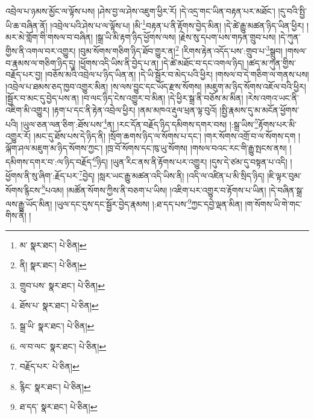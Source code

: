 འབྲེལ་པ་ཉམས་མྱོང་ལ་ལྟོས་པས། །ཤེས་བྱ་ལ་ཤེས་འཇུག་ཕྱིར་རོ། །དེ་འདྲ་གང་ཡིན་བརྟན་པར་མཐོང་། །དུ་བའི་སྤྱི་ཡི་ཆ་བཞིན་ནོ། །འབྲེལ་པའི་ཤེས་པ་ལ་ལྟོས་པ། །མི་\footnote{མ་  སྣར་ཐང་།  པེ་ཅིན། }བརྟན་པ་ནི་རྟོགས་བྱེད་མིན། །དེ་ཚེ་རྒྱུ་མཚན་ཉིད་ཡིན་ཕྱིར། །མར་མེ་གློག་གི་གསལ་བ་བཞིན། །སྒྲ་ཡི་མི་རྟག་ཉིད་ཕྱོགས་ལས། །རྗེས་སུ་དཔག་པས་གཏན་གྲུབ་པས། །དེ་ཀུན་གྱིས་ནི་འགལ་བར་འགྱུར། །བུམ་སོགས་གཅིག་ཉིད་ཐོབ་གྱུར་ན།\footnote{ནི།  སྣར་ཐང་།  པེ་ཅིན། } །རིགས་རྟེན་འདོད་པས་:གྲུབ་པ་\footnote{གྲུབ་པས་  སྣར་ཐང་།  པེ་ཅིན། }སྒྲུབ། །གསལ་བ་རྣམས་ལ་གཅིག་ཉིད་དུ། །ཕྱོགས་འདི་ཡིས་ནི་བྱེད་པ་ན། །དེ་ཚེ་མཐོང་བ་དང་འགལ་ཉིད། །ཚད་མ་ཀུན་གྱིས་བརྗོད་པར་བྱ། །བཅོས་མའི་འབྲེལ་པ་ཉིད་ཡིན་ན། །དེ་ཡི་སྦྱོར་བ་མེད་པའི་ཕྱིར། །གསལ་བ་དེ་གཅིག་ལ་གནས་པས། །འབྲེལ་པ་ཐམས་ཅད་ཁྱབ་འགྱུར་མིན། །ས་ལས་བྱུང་དང་ཡོད་རྫས་སོགས། །མཇུག་མ་ཉིད་སོགས་འཇོལ་བའི་ཕྱིར། །སྦྱོར་བ་མང་དུ་བྱེད་པས་ན། །བ་ལང་ཉིད་ངེས་འགྱུར་བ་མིན། །དེ་ཕྱིར་སྒྲ་ནི་བཅོས་མ་མིན། །རེས་འགའ་ཡང་ནི་འཇིག་མི་འགྱུར། །རྟག་པ་དང་ནི་རྟེན་འབྲེལ་ཕྱིར། །ནམ་མཁའ་རྡུལ་ཕྲན་ལྟ་བུའོ། །སྤྱི་རྣམས་དུ་མ་མངོན་ཕྱོགས་པའི། །ཡུལ་ཅན་ལན་ཅིག་:ཐོས་པས་\footnote{ཐོས་པ་  སྣར་ཐང་།  པེ་ཅིན། }ན། །རང་དོན་བརྗོད་ཉིད་དམིགས་དགར་བས། །:སྒྲ་ཡིས་\footnote{སྒྲ་ཡི་  སྣར་ཐང་།  པེ་ཅིན། }རྟོགས་པར་མི་འགྱུར་རོ། །མང་དུ་ཐོས་པས་དེ་ཉིད་ནི། །སྲོག་ཆགས་ཉིད་ལ་སོགས་པ་དང་། །གར་སོགས་འགྲོ་བ་ལ་སོགས་དག །ལྐོག་ཤལ་མཇུག་མ་ཉིད་སོགས་ཀྱང་། །ཁྲ་བོ་སོགས་དང་ཁུ་ཡུ་སོགས། །གསལ་བའང་རང་གི་རྒྱུ་སྤངས་ནས། །དམིགས་དགར་བ་:ལ་ཉིད་བརྗོད་\footnote{ལ་བ་ལང་  སྣར་ཐང་།  པེ་ཅིན། }ཉིད། །ཡུན་རིང་ནས་ནི་རྟོགས་པར་འགྱུར། །དུས་དེ་ཙམ་དུ་བསྟན་པ་འདི། །ཕྱོགས་ནི་སུ་ཞིག་:རྗོད་པར་\footnote{བརྗོད་པར་  པེ་ཅིན། }བྱེད། །སླར་ཡང་རྒྱུ་མཚན་འདི་ཡིས་ནི། །འདི་ལ་འཛིན་པ་མི་སྲིད་ཉིད། །ཇི་ལྟར་བུམ་སོགས་རྙིངས་\footnote{རྙིང་  སྣར་ཐང་།  པེ་ཅིན། }པའམ། །མཚོན་སོགས་ཀྱིས་ནི་བཅག་པ་ཡིས། །འཇིག་པར་འགྱུར་བ་རྟོགས་པ་ཡིན། །དེ་བཞིན་སྒྲ་ལས་རྒྱུ་ཡོད་མིན། །ཡུལ་དང་དུས་དང་སྦྱོར་བྱེད་རྣམས། །:ཐ་དད་པས་\footnote{ཐ་དད་  སྣར་ཐང་།  པེ་ཅིན། }ཀྱང་དབྱེ་ལྡན་མིན། །ག་སོགས་ཡི་གེ་གང་གིས་ནི། །
